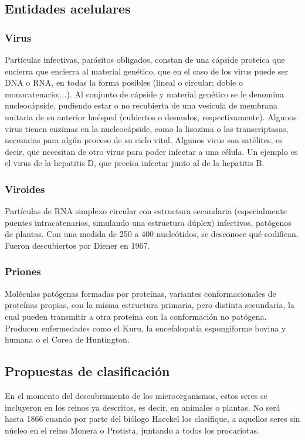 \subsection{Entidades acelulares}
\subsubsection{Virus}
Partículas infectivas, parásitos obligados, constan de una cápside proteica que encierra que encierra al material genético, que en el caso de los virus puede ser DNA o RNA, en todas la forma posibles (lineal o circular; doble o monocatenario;$\dots$). Al conjunto de cápside y material genético se le denomina nucleocápside, pudiendo estar o no recubierta de una vesícula de membrana unitaria de su anterior huésped (cubiertos o desnudos, respectivamente). Algunos virus tienen enzimas en la nucleocápside, como la lisozima o las transcriptasas, necesarias para algún proceso de su ciclo vital. Algunos virus son satélites, es decir, que necesitan de otro virus para poder infectar a una célula. Un ejemplo es el virus de la hepatitis D, que precisa infectar junto al de la hepatitis B.
\subsubsection{Viroides}
Partículas de RNA simplexo circular con estructura secundaria (especialmente puentes intracatenarios, simulando una estructura dúplex) infectivos, patógenos de plantas. Con una medida de 250 a 400 nucleótidos, se desconoce qué codifican. Fueron descubiertos por Diener en 1967. 
\subsubsection{Priones}
Moléculas patógenas formadas por proteínas, variantes conformacionales de proteínas propias, con la misma estructura primaria, pero distinta secundaria, la cual pueden transmitir a otra proteína con la conformación no patógena. Producen enfermedades como el Kuru, la encefalopatía espongiforme bovina y humana o el Corea de Huntington.
\subsection{Propuestas de clasificación}
En el momento del descubrimiento de los microorganismos, estos seres se incluyeron en los reinos ya descritos, es decir, en animales o plantas. No será hasta 1866 cuando por parte del biólogo Haeckel los clasifique, a aquellos seres sin núcleo en el reino Monera o Protista, juntando a todos los procariotas. 

